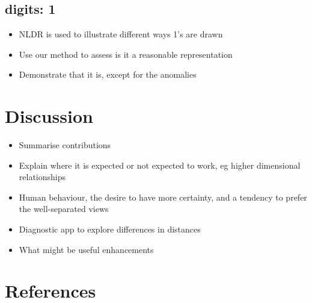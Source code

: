 \documentclass[
  12pt]{article}
\providecommand{\tightlist}{%
  \setlength{\itemsep}{0pt}\setlength{\parskip}{0pt}}\usepackage{longtable,booktabs,array}
\def\tightlist{}
\begin{document}
\subsection{digits: 1}\label{digits-1}

\begin{itemize}
\tightlist
\item
  NLDR is used to illustrate different ways 1's are drawn
\item
  Use our method to assess is it a reasonable representation
\item
  Demonstrate that it is, except for the anomalies
\end{itemize}

\section{Discussion}\label{sec-discussion}

\begin{itemize}
\tightlist
\item
  Summarise contributions
\item
  Explain where it is expected or not expected to work, eg higher
  dimensional relationships
\item
  Human behaviour, the desire to have more certainty, and a tendency to
  prefer the well-separated views
\item
  Diagnostic app to explore differences in distances
\item
  What might be useful enhancements
\end{itemize}

\section*{References}\label{references}

\renewcommand{\bibsection}{}


\newpage{}
\end{document}
